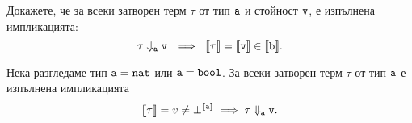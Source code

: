 \begin{theorem}
  Докажете, че за всеки затворен терм $\tau$ от тип $\texttt{a}$ и стойност $\texttt{v}$, е изпълнена импликацията:
  \[\tau \Downarrow_{\vv{a}} \vv{v}\ \implies\ \val{\tau} = \val{\vv{v}} \in \val{\vv{b}}.\]
\end{theorem}

\begin{theorem}
  Нека разгледаме тип $\texttt{a} = \texttt{nat}$ или $\texttt{a} = \texttt{bool}$.
  За всеки затворен терм $\tau$ от тип $\texttt{a}$ е изпълнена импликацията
  \[\llbracket{\tau}\rrbracket = v \neq \bot^{\llbracket{\texttt{a}}\rrbracket} \implies \tau \Downarrow_{\texttt{a}} \texttt{v}.\]
\end{theorem}


